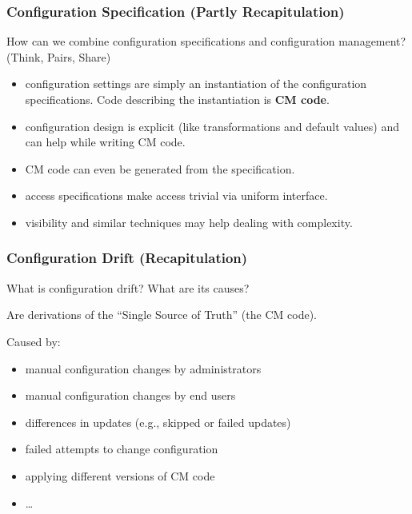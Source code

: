 \begin{frame}
	\frametitle{Configuration Specification (Partly Recapitulation)}

	\begin{task}
	How can we combine configuration specifications and configuration management?
	(Think, Pairs, Share)
	\end{task}

	\pause

	\begin{itemize}[<+-| alert@+>]
	\item configuration settings are simply an instantiation of the configuration specifications.
		Code describing the instantiation is \textbf{CM code}.
	\item configuration design is explicit (like transformations and default values) and can help while writing CM code.
	\item CM code can even be generated from the specification.
	\item access specifications make access trivial via uniform interface.
	\item visibility and similar techniques may help dealing with complexity.
	\end{itemize}
\end{frame}

\begin{frame}
	\frametitle{Configuration Drift (Recapitulation)}

	\begin{task}
	What is configuration drift? What are its causes?
	\end{task}

	\pause

	Are derivations of the ``Single Source of Truth'' (the CM code).

	Caused by:

	\begin{itemize} %
	\item manual configuration changes by administrators
	\item manual configuration changes by end users
	\item differences in updates (e.g., skipped or failed updates)
	\item failed attempts to change configuration
	\item applying different versions of CM code
	\item \dots
	\end{itemize}


\end{frame}

